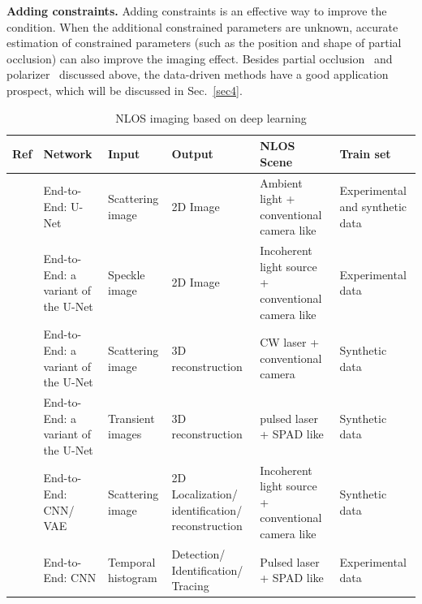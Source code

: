 \vspace{0.8em}
\noindent\textbf{Adding constraints.} 
Adding constraints is an effective way to improve the condition. When the additional constrained parameters are unknown, accurate estimation of constrained parameters (such as the position and shape of partial occlusion) can also improve the imaging effect. Besides partial occlusion~\cite{saundersComputationalPeriscopyOrdinary2019,yedidiaUsingUnknownOccluders2019} and polarizer~\cite{tanakaPolarizedNonLineofSightImaging2020} discussed above, the data-driven methods have a good application prospect, which will be discussed in Sec.~\ref{sec4}.

\begin{table}[!t]
   \caption{NLOS imaging based on deep learning\label{tab:deeplearning}}%
   {\begin{tabular}{>{\raggedright}m{1.5cm}m{2.3cm}m{2cm}m{2.7cm}m{4cm}m{3cm}}%
   \hline
   Ref & Network & Input & Output & NLOS Scene& Train set\\ %
   \hline
   \cite{zhouNonlineofsightImagingPhong2020} & End-to-End: U-Net & Scattering image & 2D Image &  Ambient light + conventional camera like \cite{saundersComputationalPeriscopyOrdinary2019} & Experimental and synthetic data\\%
   \cite{yuNonLineofSightImagingDeep2019} & End-to-End: a variant of the U-Net & Speckle image & 2D Image &  Incoherent light source + conventional camera like \cite{katz2014non} & Experimental data\\%
   \cite{chenSteadystateNonLineofSightImaging2019} & End-to-End: a variant of the U-Net & Scattering image & 3D reconstruction &  CW laser + conventional camera & Synthetic data\\%
   \cite{chopiteDeepNonLineofSightReconstruction2020} & End-to-End: a variant of the U-Net & Transient images & 3D reconstruction &  pulsed laser + SPAD like \cite{otooleConfocalNonlineofsightImaging2018} & Synthetic data\\%
   \cite{DBLP:journals/corr/abs-1810-11710} & End-to-End: CNN/ VAE & Scattering image & 2D Localization/ identification/ reconstruction &  Incoherent light source + conventional camera like \cite{chandranAdaptiveLightingDataDriven2019} & Synthetic data\\%
   \cite{musarraDetectionIdentificationTracking2019,caramazzaNeuralNetworkIdentification2017} & End-to-End: CNN & Temporal histogram & Detection/ Identification/ Tracing &  Pulsed laser + SPAD like \cite{otooleConfocalNonlineofsightImaging2018} & Experimental data\\ %

\end{tabular}}
\end{table}
